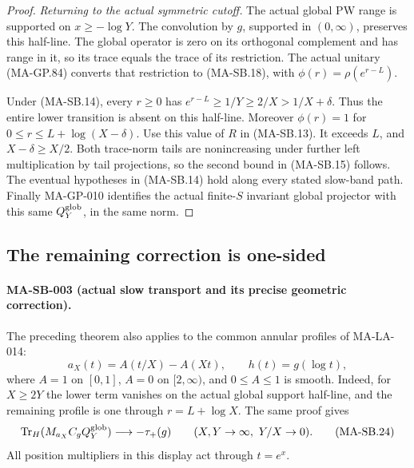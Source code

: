 \begin{proof}
\emph{Returning to the actual symmetric cutoff.}
The actual global PW range is supported on
$x\ge-\log Y$.  The convolution by $g$, supported
in $(0,\infty)$, preserves this half-line.
The global operator is zero on its orthogonal
complement and has range in it, so its trace
equals the trace of its restriction.
The actual unitary (MA-GP.84) converts that
restriction to (MA-SB.18), with
$\phi(r)=\rho(e^{r-L})$.

Under (MA-SB.14), every $r\ge0$ has
$e^{r-L}\ge1/Y\ge2/X>1/X+\delta$.
Thus the entire lower transition is absent
on this half-line.  Moreover $\phi(r)=1$
for
$0\le r\le L+\log(X-\delta)$.
Use this value of $R$ in (MA-SB.13).
It exceeds $L$, and $X-\delta\ge X/2$.
Both trace-norm tails are nonincreasing under
further left multiplication by tail projections,
so the second bound in (MA-SB.15) follows.
The eventual hypotheses in (MA-SB.14) hold
along every stated slow-band path.
Finally MA-GP-010 identifies the actual
finite-$S$ invariant global projector with
this same $Q_Y^{\rm glob}$, in the same norm.
\end{proof}

\subsection{The remaining correction is one-sided}

\paragraph{MA-SB-003 (actual slow transport and its precise geometric correction).}
The preceding theorem also applies to the common annular
profiles of MA-LA-014:
\[
       a_X(t)=A(t/X)-A(Xt),\qquad
       h(t)=g(\log t),
 \tag{MA-SB.23}
\]
where $A=1$ on $[0,1]$, $A=0$ on $[2,\infty)$,
and $0\le A\le1$ is smooth.
Indeed, for $X\ge2Y$ the lower term vanishes
on the actual global support half-line, and
the remaining profile is one through
$r=L+\log X$.
The same proof gives
\[
 \operatorname{Tr}_H(M_{a_X}C_gQ_Y^{\rm glob})
                         \longrightarrow-\tau_+(g)
       \qquad(X,Y\to\infty,\ Y/X\to0).
 \tag{MA-SB.24}
\]
All position multipliers in this display act through
$t=e^x$.

